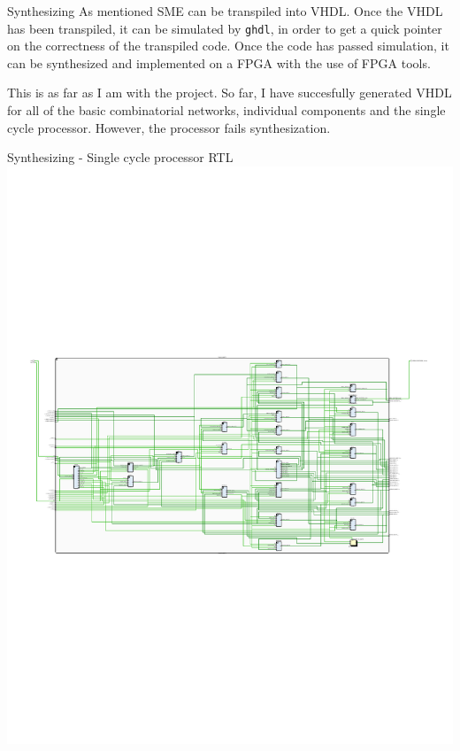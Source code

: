 \documentclass{beamer}
\begin{document}
\begin{frame}{Synthesizing}
  As mentioned SME can be transpiled into VHDL. Once the VHDL has been transpiled, it can be simulated by \texttt{ghdl}, in order to get a quick pointer on the correctness of the transpiled code. Once the code has passed simulation, it can be synthesized and implemented on a FPGA with the use of FPGA tools.

  \vspace{\baselineskip}
  This is as far as I am with the project. So far, I have succesfully generated VHDL for all of the basic combinatorial networks, individual components and the single cycle processor. However, the processor fails synthesization.
\end{frame}

\begin{frame}{Synthesizing - Single cycle processor RTL}
  \includegraphics[width=\textwidth,height=\textheight]{SingleCycleRTL.pdf}
\end{frame}
\end{document}
